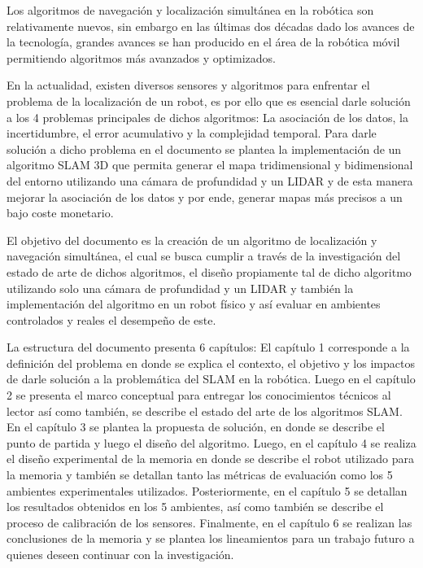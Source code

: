 
Los algoritmos de navegación y localización simultánea en la robótica son relativamente nuevos, sin embargo en las últimas dos décadas dado los avances de la tecnología, grandes avances se han producido en el área de la robótica móvil permitiendo algoritmos más avanzados y optimizados.

En la actualidad, existen diversos sensores y algoritmos para enfrentar el problema de la localización de un robot, es por ello que es esencial darle solución a los 4 problemas principales de dichos algoritmos: La asociación de los datos, la incertidumbre, el error acumulativo y la complejidad temporal. Para darle solución a dicho problema en el documento se plantea la implementación de un algoritmo SLAM 3D que permita generar el mapa tridimensional y bidimensional del entorno utilizando una cámara de profundidad y un LIDAR y de esta manera mejorar la asociación de los datos y por ende, generar mapas más precisos a un bajo coste monetario.

El objetivo del documento es la creación de un algoritmo de localización y navegación simultánea, el cual se busca cumplir a través de la investigación del estado de arte de dichos algoritmos, el diseño propiamente tal de dicho algoritmo utilizando solo una cámara de profundidad y un LIDAR y también la implementación del algoritmo en un robot físico y así evaluar en ambientes controlados y reales el desempeño de este.

La estructura del documento presenta 6 capítulos: El capítulo 1 corresponde a la definición del problema en donde se explica el contexto, el objetivo y los impactos de darle solución a la problemática del SLAM en la robótica. Luego en el capítulo 2 se presenta el marco conceptual para entregar los conocimientos técnicos al lector así como también, se describe el estado del arte de los algoritmos SLAM. En el capítulo 3 se plantea la propuesta de solución, en donde se describe el punto de partida y luego el diseño del algoritmo. Luego, en el capítulo 4 se realiza el diseño experimental de la memoria en donde se describe el robot utilizado para la memoria y también se detallan tanto las métricas de evaluación como los 5 ambientes experimentales utilizados. Posteriormente, en el capítulo 5 se detallan los resultados obtenidos en los 5 ambientes, así como también se describe el proceso de calibración de los sensores. Finalmente, en el capítulo 6 se realizan las conclusiones de la memoria y se plantea los lineamientos para un trabajo futuro a quienes deseen continuar con la investigación.

